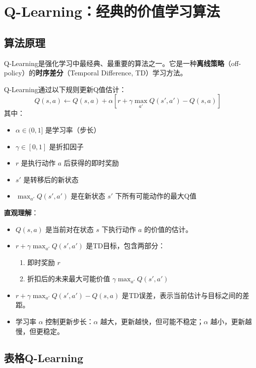 \section{Q-Learning：经典的价值学习算法}

\subsection{算法原理}

Q-Learning是强化学习中最经典、最重要的算法之一。它是一种\textbf{离线策略}（off-policy）的\textbf{时序差分}（Temporal Difference, TD）学习方法。

\begin{definition}[Q-Learning更新规则]
Q-Learning通过以下规则更新Q值估计：
\[
Q(s, a) \leftarrow Q(s, a) + \alpha \left[ r + \gamma \max_{a'} Q(s', a') - Q(s, a) \right]
\]
其中：
\begin{itemize}
    \item $\alpha \in (0, 1]$ 是学习率（步长）
    \item $\gamma \in [0, 1]$ 是折扣因子
    \item $r$ 是执行动作 $a$ 后获得的即时奖励
    \item $s'$ 是转移后的新状态
    \item $\max_{a'} Q(s', a')$ 是在新状态 $s'$ 下所有可能动作的最大Q值
\end{itemize}
\end{definition}

\textbf{直观理解}：
\begin{itemize}
    \item $Q(s, a)$ 是当前对在状态 $s$ 下执行动作 $a$ 的价值的估计。
    \item $r + \gamma \max_{a'} Q(s', a')$ 是TD目标，包含两部分：
    \begin{enumerate}
        \item 即时奖励 $r$
        \item 折扣后的未来最大可能价值 $\gamma \max_{a'} Q(s', a')$
    \end{enumerate}
    \item $r + \gamma \max_{a'} Q(s', a') - Q(s, a)$ 是TD误差，表示当前估计与目标之间的差距。
    \item 学习率 $\alpha$ 控制更新步长：$\alpha$ 越大，更新越快，但可能不稳定；$\alpha$ 越小，更新越慢，但更稳定。
\end{itemize}

\subsection{表格Q-Learning}

